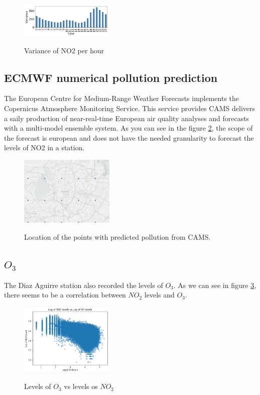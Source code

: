 \documentclass[a4paper,twocolumn,5p]{elsarticle}
\begin{document}
\begin{figure}
  \caption{Variance of NO2 per hour}
  \centering
      \includegraphics[width=0.4\textwidth]{variance}
\label{figure:variance}
\end{figure}

\subsection{ECMWF numerical pollution prediction}
\label{sec:ecmwf-numer-poll}

The European Centre for Medium-Range Weather Forecasts implements the Copernicus Atmosphere Monitoring Service.
This service provides CAMS delivers a saily production of near-real-time European air quality analyses and forecasts 
with a multi-model ensemble system. 
As you can see in the figure \ref{figure:camspoints}, the scope of the forecast is european and does not have the needed granularity to forecast 
the levels of NO2 in a station.

\begin{figure}
  \caption{Location of the points with predicted pollution from CAMS.}
  \centering
  \includegraphics[width=0.4\textwidth]{camspoints}
  \label{figure:camspoints}
\end{figure}

\subsection{$O_3$}

The Diaz Aguirre station also recorded the levels of $O_3$. As we can see in figure \ref{figure:no2vso3},
there seems to be a correlation between $NO_2$ levels and $O_3$.

\begin{figure}
  \caption{Levels of $O_3$ vs levels os $NO_2$}
  \centering
  \includegraphics[width=0.4\textwidth]{no2vso3}
  \label{figure:no2vso3}
\end{figure}
\end{document}

